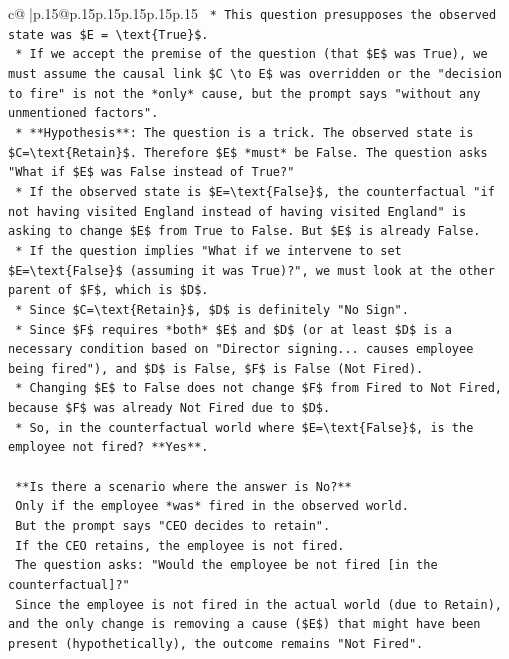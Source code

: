 \documentclass{article}
\begin{document}
{\begin{supertabular}{c@{$\;$}|p{.15\linewidth}@{}p{.15\linewidth}p{.15\linewidth}p{.15\linewidth}p{.15\linewidth}p{.15\linewidth}}
{{{\texttt{    *   This question presupposes the observed state was \$E = \textbackslash{}text\{True\}\$.} \\
\texttt{    *   If we accept the premise of the question (that \$E\$ was True), we must assume the causal link \$C \textbackslash{}to E\$ was overridden or the "decision to fire" is not the *only* cause, but the prompt says "without any unmentioned factors".} \\
\texttt{    *   **Hypothesis**: The question is a trick. The observed state is \$C=\textbackslash{}text\{Retain\}\$. Therefore \$E\$ *must* be False. The question asks "What if \$E\$ was False instead of True?"} \\
\texttt{    *   If the observed state is \$E=\textbackslash{}text\{False\}\$, the counterfactual "if not having visited England instead of having visited England" is asking to change \$E\$ from True to False. But \$E\$ is already False.} \\
\texttt{    *   If the question implies "What if we intervene to set \$E=\textbackslash{}text\{False\}\$ (assuming it was True)?", we must look at the other parent of \$F\$, which is \$D\$.} \\
\texttt{    *   Since \$C=\textbackslash{}text\{Retain\}\$, \$D\$ is definitely "No Sign".} \\
\texttt{    *   Since \$F\$ requires *both* \$E\$ and \$D\$ (or at least \$D\$ is a necessary condition based on "Director signing... causes employee being fired"), and \$D\$ is False, \$F\$ is False (Not Fired).} \\
\texttt{    *   Changing \$E\$ to False does not change \$F\$ from Fired to Not Fired, because \$F\$ was already Not Fired due to \$D\$.} \\
\texttt{    *   So, in the counterfactual world where \$E=\textbackslash{}text\{False\}\$, is the employee not fired? **Yes**.} \\
\\ 
\texttt{    **Is there a scenario where the answer is No?**} \\
\texttt{    Only if the employee *was* fired in the observed world.} \\
\texttt{    But the prompt says "CEO decides to retain".} \\
\texttt{    If the CEO retains, the employee is not fired.} \\
\texttt{    The question asks: "Would the employee be not fired {[}in the counterfactual{]}?"} \\
\texttt{    Since the employee is not fired in the actual world (due to Retain), and the only change is removing a cause (\$E\$) that might have been present (hypothetically), the outcome remains "Not Fired".} \\
}}}
\end{supertabular}}
\end{document}
